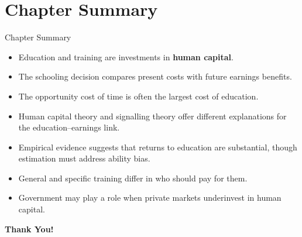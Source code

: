 \documentclass[aspectratio=169]{beamer}
\begin{document}
\section{Chapter Summary}

\begin{frame}{Chapter Summary}
\transfade
\begin{itemize}[<+->]
  \item Education and training are investments in \textbf{human capital}.
  \item The schooling decision compares present costs with future earnings benefits.
  \item The opportunity cost of time is often the largest cost of education.
  \item Human capital theory and signalling theory offer different explanations for the education--earnings link.
  \item Empirical evidence suggests that returns to education are substantial, though estimation must address ability bias.
  \item General and specific training differ in who should pay for them.
  \item Government may play a role when private markets underinvest in human capital.
\end{itemize}
\end{frame}

\begin{frame}
\centering
\Huge{\textbf{Thank You!}}
\end{frame}
\end{document}
